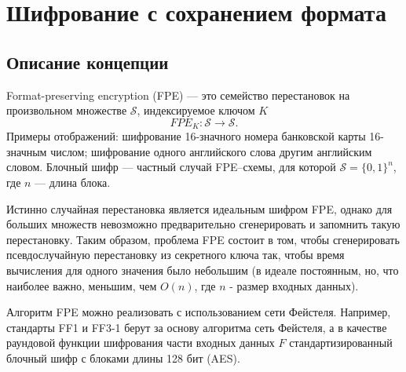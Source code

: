 \documentclass[utf8x, 14pt]{G7-32} %
\begin{document}
\frontmatter %

\maketitle %


\begin{executors}
\end{executors}

\tableofcontents %
 



\mainmatter %

\chapter{Шифрование с сохранением формата}

\section{Описание концепции}
Format-preserving encryption (FPE) --- это семейство перестановок на произвольном множестве $\mathcal{S}$, индексируемое ключом $K$ \cite{ruscrypto}
$$FPE_K: \mathcal{S} \to \mathcal{S}.$$
 Примеры отображений: шифрование 16-значного номера банковской карты 16-значным числом; шифрование одного английского слова другим английским словом. Блочный шифр --- частный случай FPE--схемы, для которой  $\mathcal{S} = \{0,1\}^n$, где $n$ --- длина блока.


Истинно случайная перестановка является идеальным шифром FPE, однако для больших множеств невозможно предварительно сгенерировать и запомнить такую перестановку. Таким образом, проблема FPE состоит в том, чтобы сгенерировать псевдослучайную перестановку из секретного ключа так, чтобы время вычисления для одного значения было небольшим (в идеале постоянным, но, что наиболее важно, меньшим, чем $O(n)$, где $n$ - размер входных данных).


Алгоритм FPE можно реализовать с использованием сети Фейстеля. Например, стандарты FF1 и FF3-1 \cite{FF13-1} берут за основу алгоритма сеть Фейстеля, а в качестве раундовой функции шифрования части входных данных $F$ стандартизированный блочный шифр с блоками длины 128 бит (AES).
\end{document}
